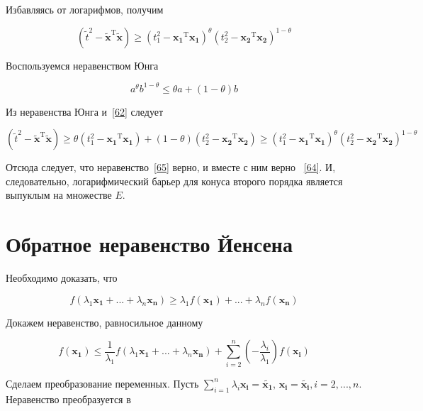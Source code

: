 	Избавляясь от логарифмов, получим
	
	\begin{equation}
	\label{65}
	(\tilde{t}^2 - \mathbf{\tilde{x}}^\text{T} \mathbf{\tilde{x}}) \geqslant (t_1^2 - \mathbf{x_1}^\text{T} \mathbf{x_1})^{\theta} (t_2^2 - \mathbf{x_2}^\text{T} \mathbf{x_2})^{1-\theta}
	\end{equation}
	
	Воспользуемся неравенством Юнга
	
	\begin{equation}
	a^\theta b^{1-\theta} \leqslant \theta a + (1-\theta) b
	\end{equation}
	
	Из неравенства Юнга и~\eqref{62} следует
	
	\begin{equation}
	(\tilde{t}^2 - \mathbf{\tilde{x}}^\text{T} \mathbf{\tilde{x}})\geqslant \theta (t_1^2 - \mathbf{x_1}^\text{T} \mathbf{x_1}) + (1-\theta)(t_2^2 - \mathbf{x_2}^\text{T} \mathbf{x_2}) \geqslant (t_1^2 - \mathbf{x_1}^\text{T} \mathbf{x_1})^{\theta} (t_2^2 - \mathbf{x_2}^\text{T} \mathbf{x_2})^{1-\theta}
	\end{equation}
	
	Отсюда следует, что неравенство~\eqref{65} верно, и вместе с ним верно ~\eqref{64}. И, следовательно, логарифмический барьер для конуса второго порядка является выпуклым на множестве $E$.
	
	\section{Обратное неравенство Йенсена}
	
	Необходимо доказать, что
	
	\begin{equation}
	f(\lambda_1 \mathbf{x_1} + ... + \lambda_n \mathbf{x_n} ) \geqslant \lambda_1 f(\mathbf{x_1}) + ... + \lambda_n f(\mathbf{x_n})
	\end{equation}
	
	Докажем неравенство, равносильное данному
	
	\begin{equation}
	 f(\mathbf{x_1})  \leqslant \frac{1}{\lambda_1}f(\lambda_1 \mathbf{x_1} + ...+\lambda_n\mathbf{x_n})  + \sum\limits_{i=2}^{n} (-\frac{\lambda_i}{\lambda_1} )  f(\mathbf{x_i})
	\end{equation}
	
	Сделаем преобразование переменных. Пусть $\sum\limits_{i=1}^{n} \lambda_i \mathbf{x_i} = \mathbf{\tilde{x_1}}$, $\mathbf{x_i} = \mathbf{\tilde{x_i}}, i=2,...,n$. Неравенство преобразуется в
	
